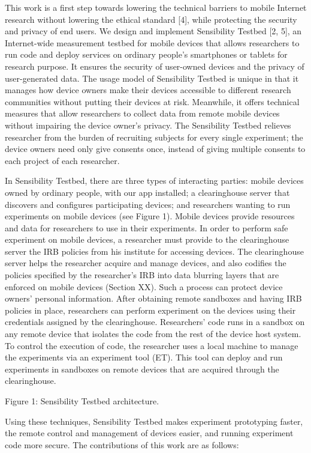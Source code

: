 This work is a first step towards lowering the technical
barriers to mobile Internet research without lowering the
ethical standard [4], while protecting the security and privacy
of end users. We design and implement Sensibility Testbed [2,
5], an Internet-wide measurement testbed for mobile devices that
allows researchers to run code and deploy services on ordinary
people's smartphones or tablets for research purpose. It ensures
the security of user-owned devices and the privacy of
user-generated data. The usage model of Sensibility Testbed is
unique in that it manages how device owners make their devices
accessible to different research communities without putting
their devices at risk. Meanwhile, it offers technical measures
that allow researchers to collect data from remote mobile
devices without impairing the device owner's privacy. The
Sensibility Testbed relieves researcher from the burden of
recruiting subjects for every single experiment; the device
owners need only give consents once, instead of giving multiple
consents to each project of each researcher.

In Sensibility Testbed, there are three types of interacting
parties: mobile devices owned by ordinary people, with our app
installed; a clearinghouse server that discovers and configures
participating devices; and researchers wanting to run
experiments on mobile devices (see Figure 1). Mobile devices
provide resources and data for researchers to use in their
experiments. In order to perform safe experiment on mobile
devices, a researcher must provide to the clearinghouse server
the IRB policies from his institute for accessing devices. The
clearinghouse server helps the researcher acquire and manage
devices, and also codifies the policies specified by the
researcher's IRB into data blurring layers that are enforced on
mobile devices (Section XX). Such a process can protect device
owners' personal information. After obtaining remote sandboxes
and having IRB policies in place, researchers can perform
experiment on the devices using their credentials assigned by
the clearinghouse. Researchers' code runs in a sandbox on any
remote device that isolates the code from the rest of the device
host system. To control the execution of code, the researcher
uses a local machine to manage the experiments via an experiment
tool (ET). This tool can deploy and run experiments in sandboxes
on remote devices that are acquired through the clearinghouse.


Figure 1: Sensibility Testbed architecture. 

Using these techniques, Sensibility Testbed makes experiment
prototyping faster, the remote control and management of devices
easier, and running experiment code more secure. The
contributions of this work are as follows:
